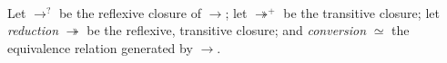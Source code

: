 \begin{definition}
\begin{code}
\>[2] \AgdaSymbol{:}  \AgdaSymbol{\{}\AgdaSymbol{\}} \AgdaSymbol{\{}\AgdaSymbol{\}} \AgdaSymbol{\{}\AgdaSymbol{\}} \AgdaSymbol{\{}\AgdaSymbol{\}} \AgdaSymbol{\{}\AgdaSymbol{\}} \AgdaSymbol{\{}\AgdaSymbol{\}} \AgdaSymbol{\{}\AgdaSymbol{\}} \AgdaSymbol{\{}\AgdaSymbol{\}} \AgdaSymbol{\{}\AgdaSymbol{\}}   \AgdaSymbol{\{}\AgdaSymbol{\}}  \AgdaSymbol{(}     \AgdaSymbol{(}  \AgdaSymbol{)}        \AgdaInductiveConstructor{[]}\AgdaSymbol{)} \AgdaSymbol{(}   \AgdaSymbol{(}    \AgdaSymbol{)}       \AgdaSymbol{)}\<%
\\
\>[0]\<[2]%
\>[2] \AgdaSymbol{:}  \AgdaSymbol{\{}\AgdaSymbol{\}} \AgdaSymbol{\{}\AgdaSymbol{\}} \AgdaSymbol{\{}\AgdaSymbol{\}} \AgdaSymbol{\{}\AgdaSymbol{\}} \AgdaSymbol{\{}\AgdaSymbol{\}} \AgdaSymbol{\{}\AgdaSymbol{\}} \AgdaSymbol{\{}\AgdaSymbol{\}}   \AgdaSymbol{\{}\AgdaSymbol{\}}  \AgdaSymbol{(}     \AgdaSymbol{(}  \AgdaSymbol{)}      \AgdaInductiveConstructor{[]}\AgdaSymbol{)} \AgdaSymbol{(}   \AgdaSymbol{(}  \AgdaSymbol{)}       \AgdaSymbol{)}\<%
\end{code}

Let $\rightarrow^?$ be the reflexive closure of $\rightarrow$;
let $\twoheadrightarrow^+$ be the transitive closure;
let \emph{reduction} $\twoheadrightarrow$ be the reflexive, transitive closure; and \emph{conversion} $\simeq$ the equivalence relation generated by $\rightarrow$.
\end{definition}

